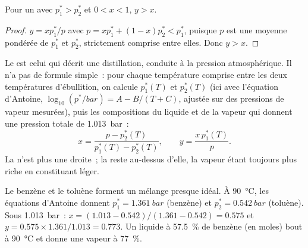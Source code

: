 \begin{proposition}\label{prop:b2:liquid-vapour-diagrams:richer}
Pour un  avec $p_1^* > p_2^*$ et $0 < x < 1$, $y > x$.
\end{proposition}

\begin{proof}
$y = xp_1^*/p$ avec $p = xp_1^* + (1 - x)p_2^* < p_1^*$, puisque $p$ est une
moyenne pondérée de $p_1^*$ et $p_2^*$, strictement comprise entre elles. Donc $y >
x$.
\end{proof}

Le  est celui qui décrit une distillation, conduite à la
pression atmosphérique. Il n'a pas de formule simple~: pour chaque température comprise entre
les deux températures d'ébullition, on calcule $p_1^*(T)$ et $p_2^*(T)$ (ici avec
l'équation d'Antoine, $\log_{10}(p^*/\unit{bar}) = A - B/(T + C)$, ajustée sur des
pressions de vapeur mesurées), puis les compositions du liquide et de la vapeur qui
donnent une pression totale de \qty{1.013}{bar}~:
\[
  x = \frac{p - p_2^*(T)}{p_1^*(T) - p_2^*(T)}, \qquad y = \frac{x\,p_1^*(T)}{p} .
\]
La  n'est plus une droite~; la  reste au-dessus d'elle,
la vapeur étant toujours plus riche en constituant léger.

\begin{example}\label{ex:b2:liquid-vapour-diagrams:benzene-toluene}
Le benzène et le toluène forment un mélange presque idéal. À \qty{90}{\degreeCelsius},
les équations d'Antoine donnent $p_1^* = \qty{1.361}{bar}$ (benzène) et $p_2^* =
\qty{0.542}{bar}$ (toluène). Sous \qty{1.013}{bar}~: $x = (1.013 - 0.542)/(1.361 -
0.542) = 0.575$ et $y = 0.575 \times 1.361/1.013 = 0.773$. Un liquide à 57.5~\%
de benzène (en moles) bout à \qty{90}{\degreeCelsius} et donne une vapeur à
77~\%.
\end{example}

